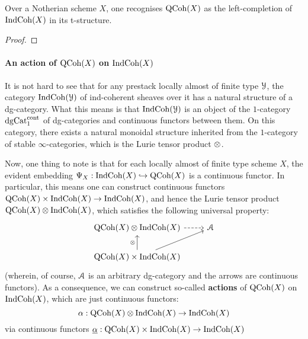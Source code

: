                     \begin{proposition} \label{prop: qcoh_is_the_left_completion_of_indcoh}
                        Over a Notherian scheme $X$, one recognises $\mathrm{QCoh}(X)$ as the left-completion of $\mathrm{Ind}\mathrm{Coh}(X)$ in its t-structure.
                    \end{proposition}
                        \begin{proof}
                            
                        \end{proof}
                    
                \paragraph{An action of \texorpdfstring{$\mathrm{QCoh}(X)$}{} on \texorpdfstring{$\mathrm{Ind}\mathrm{Coh}(X)$}{}}
                    It is not hard to see that for any prestack locally almost of finite type $\mathcal{Y}$, the category $\mathrm{Ind}\mathrm{Coh}(\mathcal{Y})$ of ind-coherent sheaves over it has a natural structure of a dg-category. What this means is that $\mathrm{Ind}\mathrm{Coh}(\mathcal{Y})$ is an object of the $1$-category $\mathrm{dg}\mathrm{Cat}^{\mathrm{cont}}_1$ of dg-categories and continuous functors between them. On this category, there exists a natural monoidal structure inherited from the $1$-category of stable $\infty$-categories, which is the Lurie tensor product $\tensor$. 
                
                    Now, one thing to note is that for each locally almost of finite type scheme $X$, the evident embedding $\Psi_X: \mathrm{Ind}\mathrm{Coh}(X) \hookrightarrow \mathrm{QCoh}(X)$ is a continuous functor. In particular, this means one can construct continuous functors $\QCoh(X) \x \Ind\Coh(X) \to \Ind\Coh(X)$, and hence the Lurie tensor product $\QCoh(X) \tensor \Ind\Coh(X)$, which satisfies the following universal property:
                        $$
                            \begin{tikzcd}
                            	{\QCoh(X) \tensor \Ind\Coh(X)} & \calA \\
                            	{\QCoh(X) \x \Ind\Coh(X)}
                            	\arrow[from=2-1, to=1-2]
                            	\arrow[dashed, from=1-1, to=1-2]
                            	\arrow["\tensor", from=2-1, to=1-1]
                            \end{tikzcd}
                        $$
                    (wherein, of course, $\mathcal{A}$ is an arbitrary dg-category and the arrows are continuous functors). As a consequence, we can construct so-called \textbf{actions} of $\mathrm{QCoh}(X)$ on $\mathrm{Ind}\mathrm{Coh}(X)$, which are just continuous functors:
                        $$\alpha: \QCoh(X) \tensor \Ind\Coh(X) \to \Ind\Coh(X)$$
                    via continuous functors $\underline{\alpha}: \QCoh(X) \x \Ind\Coh(X) \to \Ind\Coh(X)$
                        
